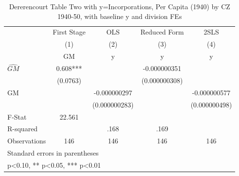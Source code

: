 \begin{table}[htbp]\centering
\def\sym#1{\ifmmode^{#1}\else\(^{#1}\)\fi}
\caption{Dererencourt Table Two with y=Incorporations, Per Capita (1940) by CZ 1940-50, with baseline y and division FEs}
\begin{tabular}{l*{4}{c}}
\toprule
                    & First Stage   &         OLS   &Reduced Form   &        2SLS   \\
                    &\multicolumn{1}{c}{(1)}&\multicolumn{1}{c}{(2)}&\multicolumn{1}{c}{(3)}&\multicolumn{1}{c}{(4)}\\
                    &\multicolumn{1}{c}{GM}&\multicolumn{1}{c}{y}&\multicolumn{1}{c}{y}&\multicolumn{1}{c}{y}\\
\midrule
$\hat{GM}$          &       0.608***&               &-0.000000351   &               \\
                    &    (0.0763)   &               &(0.000000308)   &               \\
\addlinespace
GM                  &               &-0.000000297   &               &-0.000000577   \\
                    &               &(0.000000283)   &               &(0.000000498)   \\
\midrule
F-Stat              &      22.561   &               &               &               \\
R-squared           &               &        .168   &        .169   &               \\
Observations        &         146   &         146   &         146   &         146   \\
\bottomrule
\multicolumn{5}{l}{\footnotesize Standard errors in parentheses}\\
\multicolumn{5}{l}{\footnotesize * p<0.10, ** p<0.05, *** p<0.01}\\
\end{tabular}
\end{table}
